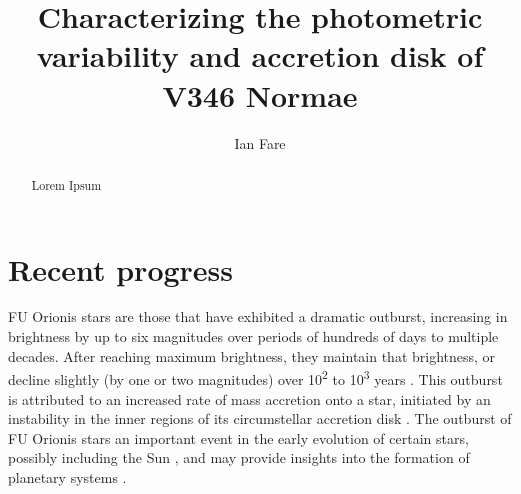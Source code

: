\documentclass[iop,apj,tighten]{emulateapj}
\begin{document}
\newpage

\title{Characterizing the photometric variability and accretion disk of V346 Normae}
\author{Ian Fare}

\begin{abstract}
Lorem Ipsum
\end{abstract}

\maketitle
\thispagestyle{fancy}

\section{Recent progress}
FU Orionis stars are those that have exhibited a dramatic outburst, increasing in brightness by up to six magnitudes over periods of hundreds of days to multiple decades. After reaching maximum brightness, they maintain that brightness, or decline slightly (by one or two magnitudes) over 10\textsuperscript{2} to 10\textsuperscript{3} years \citep{hartmann_fu_1996}. This outburst is attributed to an increased rate of mass accretion onto a star, initiated by an instability in the inner regions of its circumstellar accretion disk \citep{turner_models_1997}. The outburst of FU Orionis stars an important event in the early evolution of certain stars, possibly including the Sun \citep{herbig_eruptive_1977}, and may provide insights into the formation of planetary systems \citep{turner_models_1997}.
\end{document}
